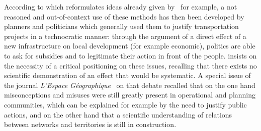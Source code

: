 \documentclass[11pt]{article}
\newcommand{\noun}[1]{\textsc{#1}}
\begin{document}
According to \cite{offner1993effets} which reformulates ideas already given by~\cite{franccois1977autoroutes} for example, a not reasoned and out-of-context use of these methods has then been developed by planners and politicians which generally used them to justify transportation projects in a technocratic manner: through the argument of a direct effect of a new infrastructure on local development (for example economic), politics are able to ask for subsidies and to legitimate their action in front of the people. \cite{offner1993effets} insists on the necessity of a critical positioning on these issues, recalling that there exists no scientific demonstration of an effect that would be systematic. A special issue of the journal \emph{L'Espace Géographique}~\citep{espacegeo2014effets} on that debate recalled that on the one hand misconceptions and misuses were still greatly present in operational and planning communities, which can be explained for example by the need to justify public actions, and on the other hand that a scientific understanding of relations between networks and territories is still in construction. 



\end{document}
